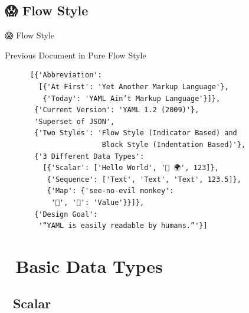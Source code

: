 \documentclass{beamer}
\begin{document}
\subsection{😱 Flow Style}

\begin{frame}[fragile]{😱 Flow Style}
  \begin{block}{Previous Document in Pure Flow Style}~\\
    \begin{verbatim}
      [{'Abbreviation':
        [{'At First': 'Yet Another Markup Language'},
         {'Today': 'YAML Ain’t Markup Language'}]},
       {'Current Version': 'YAML 1.2 (2009)'},
       'Superset of JSON',
       {'Two Styles': 'Flow Style (Indicator Based) and
                       Block Style (Indentation Based)'},
       {'3 Different Data Types':
         [{'Scalar': ['Hello World', '👋 🌍', 123]},
          {'Sequence': ['Text', 'Text', 'Text', 123.5]},
          {'Map': {'see-no-evil monkey':
           '🙈', '🔑': 'Value'}}]},
       {'Design Goal':
        '“YAML is easily readable by humans.”'}]
     \end{verbatim}
  \end{block}
\end{frame}

\section{🐣 Basic Data Types}

\subsection{📏  Scalar}
\end{document}
